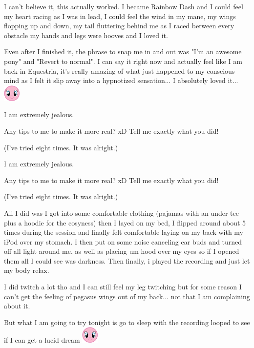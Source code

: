 \documentclass[ebook,12pt,oneside,openany]{memoir}
\begin{document}
\begin{tcolorbox}[title=Feather Gem]
\begin{tcolorbox}[title=Jordan Dash]
\par{I can't believe it, this actually worked. I became Rainbow Dash and I could feel my heart racing as I was in lead, I could feel the wind in my mane, my wings flopping up and down, my tail fluttering behind me as I raced between every obstacle my hands and legs were hooves and I loved it.}
\newline{}
\par{Even after I finished it, the phrase to snap me in and out was "I'm an awesome pony" and "Revert to normal". I can say it right now and actually feel like I am back in Equestria, it's really amazing of what just happened to my conscious mind as I felt it slip away into a hypnotized sensation... I absolutely loved it... \includegraphics{images/mlp_smile.png}}
\end{tcolorbox}
\par{I am extremely jealous.}
\par{Any tips to me to make it more real?  xD  Tell me exactly what you did!}
\par{(I've tried eight times.  It was alright.)}
\end{tcolorbox}
\begin{tcolorbox}[title=Jordan Dash]
\begin{tcolorbox}[title=Feather Gem]
\par{I am extremely jealous.}
\par{Any tips to me to make it more real?  xD  Tell me exactly what you did!}
\par{(I've tried eight times.  It was alright.)}
\end{tcolorbox}
\par{All I did was I got into some comfortable clothing (pajamas with an under-tee plus a hoodie for the cosyness) then I layed on my bed, I flipped around about 5 times during the session and finally felt comfortable laying on my back with my iPod over my stomach. I then put on some noise canceling ear buds and turned off all light around me, as well as placing um hood over my eyes so if I opened them all I could see was darkness. Then finally, i played the recording and just let my body relax.}
\newline{}
\par{I did twitch a lot tho and I can still feel my leg twitching but for some reason I can't get the feeling of pegasus wings out of my back... not that I am complaining about it. }
\newline{}
\par{But what I am going to try tonight is go to sleep with the recording looped to see if I can get a lucid dream \includegraphics{images/mlp_smile.png}}
\end{tcolorbox}
\end{document}
